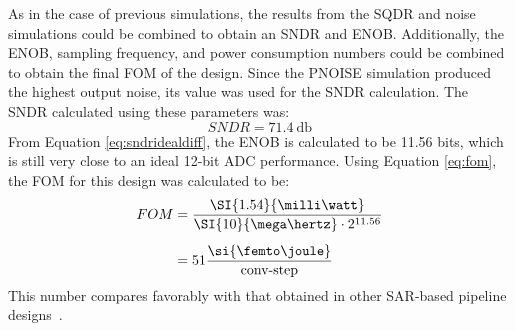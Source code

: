 As in the case of previous simulations, the results from the SQDR and noise simulations could be combined to obtain an SNDR and ENOB. Additionally, the ENOB, sampling frequency, and power consumption numbers could be combined to obtain the final FOM of the design. Since the PNOISE simulation produced the highest output noise, its value was used for the SNDR calculation. The SNDR calculated using these parameters was:
\begin{equation}
\label{eq:sndrdiffrealota}
SNDR = \SI{71.4}{\decibel}
\end{equation}
From Equation \ref{eq:sndridealdiff}, the ENOB is calculated to be 11.56 bits, which is still very close to an ideal 12-bit ADC performance.  Using Equation \ref{eq:fom}, the FOM for this design was calculated to be:
\begin{align}
\label{eq:fomrealota}
FOM &= \dfrac{\SI{1.54}{\milli\watt}}{\SI{10}{\mega\hertz}\cdot 2^{11.56}} \\[0.5em]
	&= 51\dfrac{\si{\femto\joule}}{\textnormal{conv-step}}
\end{align}
This number compares favorably with that obtained in other SAR-based pipeline designs~\cite{murmannadcsurvey}.

